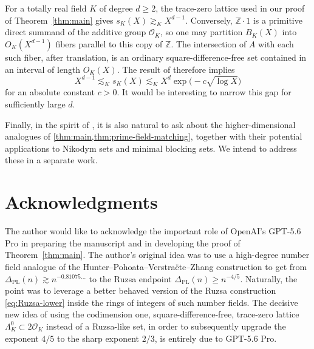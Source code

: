 \documentclass[11pt,reqno]{amsart}
\theoremstyle{definition}
\theoremstyle{remark}
\newcommand{\OK}{\mathcal{O}_K}
\newcommand{\PL}{\Delta_{\mathrm{PL}}}
\begin{document}
For a totally real field $K$ of degree $d \geq 2$, the trace-zero lattice used in our proof of Theorem~\ref{thm:main} gives $s_K(X)\gtrsim_K X^{d-1}$. Conversely, $\mathbb Z\cdot1$ is a primitive direct summand of the
additive group $\OK$, so one may partition $B_K(X)$ into
$O_K(X^{d-1})$ fibers parallel to this copy of $\mathbb Z$.  The intersection of $A$ with each such fiber, after translation, is an ordinary square-difference-free set contained in an interval of
length $O_K(X)$. The result of \cite{GreenSawhney2024} therefore
implies
$$X^{d-1}\lesssim_K s_K(X) \lesssim_K X^d\exp\!\bigl(-c\sqrt{\log X}\bigr)$$
for an absolute constant $c>0$. It would be interesting to narrow this gap for sufficiently large $d$. 

Finally, in the spirit of \cite{HPVZ2026}, it is also natural to ask about the higher-dimensional analogues of \cref{thm:main,thm:prime-field-matching}, together with their potential applications to Nikodym sets and minimal blocking sets. We intend to address these in a separate work.

\medskip

\section*{Acknowledgments}

The author would like to acknowledge the important role of OpenAI's GPT-5.6 Pro in preparing the manuscript and in developing the proof of Theorem~\ref{thm:main}.  The author's original idea was to use a high-degree number field analogue of the Hunter--Pohoata--Verstra\"ete--Zhang construction to get from $\PL(n)\gtrsim n^{-0.81075\ldots}$ to the Ruzsa endpoint $\PL(n)\ge n^{-4/5}$. Naturally, the point was to leverage a better behaved version of the Ruzsa construction \eqref{eq:Ruzsa-lower} inside the rings of integers of such number fields. The decisive new idea of using the codimension one, square-difference-free, trace-zero lattice $\Lambda_K^0\subset 2\OK$ instead of a Ruzsa-like set, in order to subsequently upgrade the exponent $4/5$ to the sharp exponent $2/3$, is entirely due to GPT-5.6 Pro.
\end{document}
